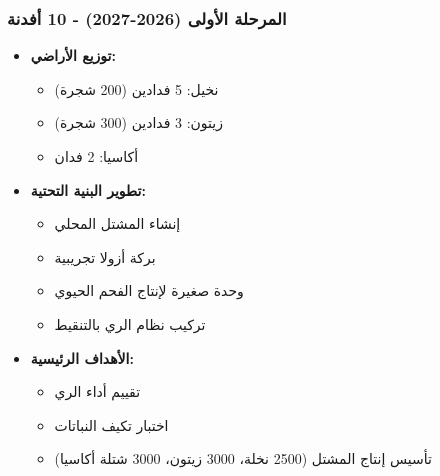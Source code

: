 \subsubsection{المرحلة الأولى (2026-2027) - 10 أفدنة}
\begin{itemize}
    \item \textbf{توزيع الأراضي:}
    \begin{itemize}
        \item نخيل: 5 فدادين (200 شجرة)
        \item زيتون: 3 فدادين (300 شجرة)
        \item أكاسيا: 2 فدان
    \end{itemize}
    
    \item \textbf{تطوير البنية التحتية:}
    \begin{itemize}
        \item إنشاء المشتل المحلي
        \item بركة أزولا تجريبية
        \item وحدة صغيرة لإنتاج الفحم الحيوي
        \item تركيب نظام الري بالتنقيط
    \end{itemize}
    
    \item \textbf{الأهداف الرئيسية:}
    \begin{itemize}
        \item تقييم أداء الري
        \item اختبار تكيف النباتات
        \item تأسيس إنتاج المشتل (2500 نخلة، 3000 زيتون، 3000 شتلة أكاسيا)
    \end{itemize}
\end{itemize}

